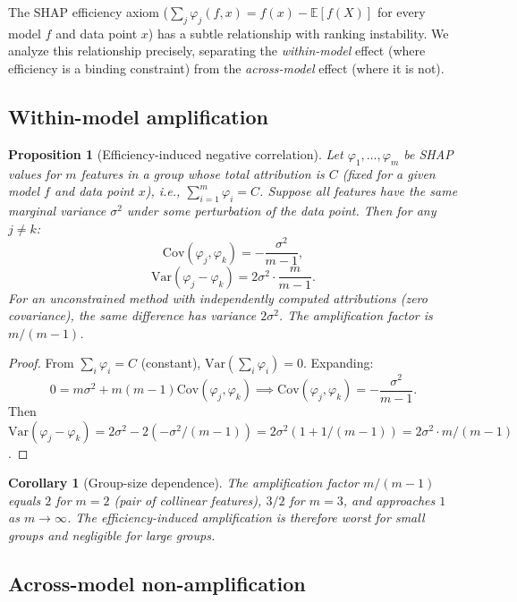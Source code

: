 \documentclass{article}
\newtheorem{corollary}[theorem]{Corollary}
\newtheorem{proposition}[theorem]{Proposition}
\begin{document}
The SHAP efficiency axiom ($\sum_j \varphi_j(f,x) = f(x) - \mathbb{E}[f(X)]$
for every model $f$ and data point $x$) has a subtle relationship with
ranking instability.  We analyze this relationship precisely, separating
the \emph{within-model} effect (where efficiency is a binding constraint)
from the \emph{across-model} effect (where it is not).

\subsection{Within-model amplification}

\begin{proposition}[Efficiency-induced negative correlation]
\label{prop:efficiency-negcor}
Let $\varphi_1, \ldots, \varphi_m$ be SHAP values for $m$ features in a
group whose total attribution is $C$ (fixed for a given model $f$ and
data point $x$), i.e., $\sum_{i=1}^m \varphi_i = C$.  Suppose all
features have the same marginal variance $\sigma^2$ under some
perturbation of the data point.  Then for any $j \neq k$:
\[
  \mathrm{Cov}(\varphi_j, \varphi_k) = -\frac{\sigma^2}{m-1},
\]
\[
  \mathrm{Var}(\varphi_j - \varphi_k)
  = 2\sigma^2 \cdot \frac{m}{m-1}.
\]
For an unconstrained method with independently computed attributions
(zero covariance), the same difference has variance $2\sigma^2$.
The amplification factor is $m/(m-1)$.
\end{proposition}

\begin{proof}
From $\sum_i \varphi_i = C$ (constant), $\mathrm{Var}(\sum_i \varphi_i) = 0$.
Expanding:
\[
  0 = m\sigma^2 + m(m-1)\mathrm{Cov}(\varphi_j, \varphi_k)
  \implies \mathrm{Cov}(\varphi_j, \varphi_k) = -\frac{\sigma^2}{m-1}.
\]
Then $\mathrm{Var}(\varphi_j - \varphi_k) = 2\sigma^2 - 2(-\sigma^2/(m-1))
= 2\sigma^2(1 + 1/(m-1)) = 2\sigma^2 \cdot m/(m-1)$.
\end{proof}

\begin{corollary}[Group-size dependence]
\label{cor:groupsize}
The amplification factor $m/(m-1)$ equals $2$ for $m=2$ (pair of
collinear features), $3/2$ for $m=3$, and approaches $1$ as
$m \to \infty$.  The efficiency-induced amplification is therefore
worst for small groups and negligible for large groups.
\end{corollary}

\subsection{Across-model non-amplification}
\label{subsec:across-model}
\end{document}
